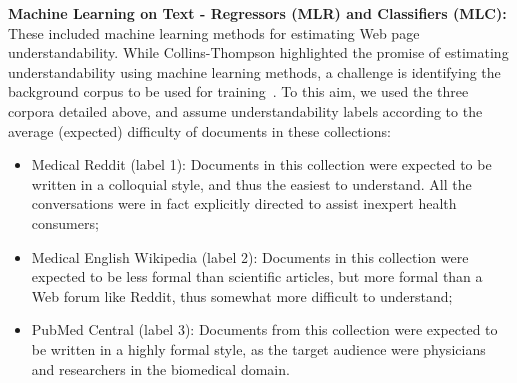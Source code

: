 


\textbf{Machine Learning on Text - Regressors (MLR) and Classifiers (MLC):} These included machine learning methods for estimating Web page understandability. While Collins-Thompson highlighted the promise of estimating understandability using machine learning methods, a challenge is identifying the background corpus to be used for training~\cite{collins2014computational}. To this aim, we used the three corpora detailed above, and assume understandability labels according to the average (expected) difficulty of documents in these collections:




\begin{itemize}
    \item Medical Reddit (label 1): Documents in this collection were expected to be written in a colloquial style, and thus the easiest to understand. All the conversations were in fact explicitly directed to assist inexpert health consumers;
    \item Medical English Wikipedia (label 2): Documents in this collection were expected to be less formal than scientific articles, but more formal than a Web forum like Reddit, thus somewhat more difficult to understand;
    \item PubMed Central (label 3): Documents from this collection were expected to be written in a highly formal style, as the target audience were physicians and researchers in the biomedical domain.
\end{itemize}

